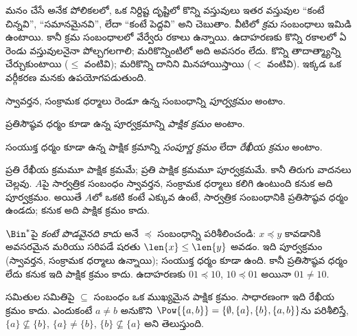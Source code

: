 \documentclass[../../../include/open-logic-section]{subfiles}
\begin{document}

\begin{explain}
మనం చేసే అనేక పోలికలలో, ఒక నిర్దిష్ట దృష్టిలో కొన్ని వస్తువులు ఇతర
వస్తువుల ``కంటే చిన్నవి'', ``సమానమైనవి'', లేదా ``కంటే పెద్దవి''
అని చెబుతాం. వీటిలో \emph{క్రమ} సంబంధాలు ఇమిడి ఉంటాయి.
కానీ క్రమ సంబంధాలలో వేర్వేరు రకాలు ఉన్నాయి.
ఉదాహరణకు కొన్ని రకాలలో ఏ రెండు వస్తువులనైనా పోల్చగలగాలి; మరికొన్నింటిలో
అది అవసరం లేదు. కొన్ని తాదాత్మ్యాన్ని చేర్చుకుంటాయి ($\le$ వంటివి);
మరికొన్ని దానిని మినహాయిస్తాయి ($<$ వంటివి).
ఇక్కడ ఒక వర్గీకరణ మనకు ఉపయోగపడుతుంది.
\end{explain}

\begin{defn}[పూర్వక్రమం]
స్వావర్తన, సంక్రామక ధర్మాలు రెండూ ఉన్న సంబంధాన్ని
\emph{పూర్వక్రమం} అంటాం.
\end{defn}

\begin{defn}[పాక్షిక క్రమం]
ప్రతిసౌష్ఠవ ధర్మం కూడా ఉన్న పూర్వక్రమాన్ని
\emph{పాక్షిక క్రమం} అంటాం.
\end{defn}

\begin{defn}[రేఖీయ క్రమం]
సంయుక్త ధర్మం కూడా ఉన్న పాక్షిక క్రమాన్ని
\emph{సంపూర్ణ క్రమం} లేదా \emph{రేఖీయ క్రమం} అంటాం.
\end{defn}

\begin{ex}
ప్రతి రేఖీయ క్రమమూ పాక్షిక క్రమమే; ప్రతి పాక్షిక క్రమమూ పూర్వక్రమమే.
కానీ తిరుగు వాదనలు చెల్లవు. $A$పై సార్వత్రిక సంబంధం స్వావర్తన,
సంక్రామక ధర్మాలు కలిగి ఉంటుంది కనుక అది పూర్వక్రమం.
అయితే $A$లో ఒకటి కంటే ఎక్కువ  ఉంటే, సార్వత్రిక
సంబంధానికి ప్రతిసౌష్ఠవ ధర్మం ఉండదు; కనుక అది పాక్షిక క్రమం కాదు.
\end{ex}

\begin{ex}
$\Bin^*$పై \emph{కంటే పొడవైనది కాదు} అనే $\preccurlyeq$ సంబంధాన్ని
పరిశీలించండి: $x \preccurlyeq y$ కావడానికి అవసరమైన మరియు సరిపడే
షరతు $\len{x} \le \len{y}$ అవడం.
ఇది పూర్వక్రమం (స్వావర్తన, సంక్రామక ధర్మాలు ఉన్నాయి);
సంయుక్త ధర్మం కూడా ఉంది. కానీ ప్రతిసౌష్ఠవ ధర్మం లేదు కనుక
ఇది పాక్షిక క్రమం కాదు. ఉదాహరణకు $01 \preccurlyeq 10$,
$10 \preccurlyeq 01$ అయినా $01 \neq 10$.
\end{ex}

\begin{ex}
సమితుల సమితిపై $\subseteq$ సంబంధం ఒక ముఖ్యమైన పాక్షిక క్రమం.
సాధారణంగా ఇది రేఖీయ క్రమం కాదు. ఎందుకంటే $a \neq b$ అనుకొని
$\Pow{\{a, b\}} = \{\emptyset, \{a\}, \{b\}, \{a,b\}\}$ను పరిశీలిస్తే,
$\{a\} \nsubseteq \{b\}$, $\{a\} \neq \{b\}$,
$\{b\} \nsubseteq \{a\}$ అని తెలుస్తుంది.
\end{ex}
\end{document}
